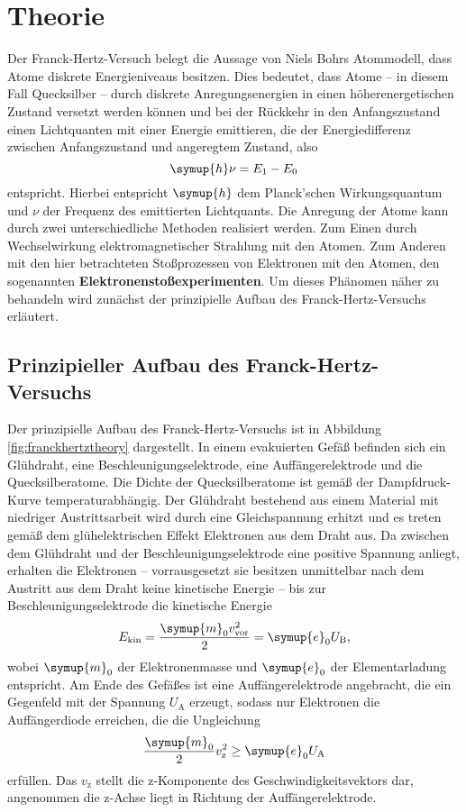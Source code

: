 \section{Theorie}
\label{sec:Theorie}

Der Franck-Hertz-Versuch belegt die Aussage von Niels Bohrs Atommodell, dass Atome diskrete 
Energieniveaus besitzen. 
Dies bedeutet, dass Atome -- in diesem Fall Quecksilber -- durch diskrete Anregungsenergien 
in einen höherenergetischen Zustand versetzt werden können und bei der Rückkehr in den 
Anfangszustand einen Lichtquanten mit einer Energie emittieren, die der Energiedifferenz zwischen
Anfangszustand und angeregtem Zustand, also
\begin{equation}
	\label{eqn:photonemission}
	\symup{h} \nu = E_1 - E_0
\end{equation}
entspricht. Hierbei entspricht $\symup{h}$ dem Planck'schen Wirkungsquantum und $\nu$ der
Frequenz des emittierten Lichtquants.
Die Anregung der Atome kann durch zwei unterschiedliche Methoden realisiert werden.
Zum Einen durch Wechselwirkung elektromagnetischer Strahlung mit den Atomen.
Zum Anderen mit den hier betrachteten Stoßprozessen von Elektronen mit den Atomen, den 
sogenannten \textbf{Elektronenstoßexperimenten}.
Um dieses Phänomen näher zu behandeln wird zunächst der prinzipielle Aufbau des 
Franck-Hertz-Versuchs erläutert.
\subsection{Prinzipieller Aufbau des Franck-Hertz-Versuchs}
Der prinzipielle Aufbau des Franck-Hertz-Versuchs ist in Abbildung \ref{fig:franckhertztheory}
dargestellt.
In einem evakuierten Gefäß befinden sich ein Glühdraht, eine Beschleunigungselektrode, eine
Auffängerelektrode und die Quecksilberatome. 
Die Dichte der Quecksilberatome ist gemäß der Dampfdruck-Kurve temperaturabhängig.
Der Glühdraht bestehend aus einem Material mit niedriger Austrittsarbeit wird durch eine 
Gleichspannung erhitzt und es treten gemäß dem glühelektrischen Effekt Elektronen 
aus dem Draht aus.
Da zwischen dem Glühdraht und der Beschleunigungselektrode eine positive Spannung anliegt,
erhalten die Elektronen -- vorrausgesetzt sie besitzen unmittelbar nach dem Austritt aus dem
Draht keine kinetische Energie -- bis zur Beschleunigungselektrode die kinetische Energie 
\begin{equation}
	E_{\mathrm{kin}} = \frac{\symup{m}_0 v_{\mathrm{vor}}^2}{2} = \symup{e}_0 U_{\mathrm{B}} \mathrm{,}
\end{equation}
wobei $\symup{m}_0$ der Elektronenmasse und $\symup{e}_0$ der Elementarladung entspricht.
Am Ende des Gefäßes ist eine Auffängerelektrode angebracht, die ein Gegenfeld mit der Spannung
$U_{\mathrm{A}}$ erzeugt, sodass nur Elektronen die Auffängerdiode erreichen, die die 
Ungleichung
\begin{equation}
	\frac{\symup{m}_0}{2} v_{\mathrm{z}}^2 \geq \symup{e}_0 U_{\mathrm{A}}
\end{equation}
erfüllen. Das $v_{\mathrm{z}}$ stellt die z-Komponente des Geschwindigkeitsvektors dar, 
angenommen die z-Achse liegt in Richtung der Auffängerelektrode.

